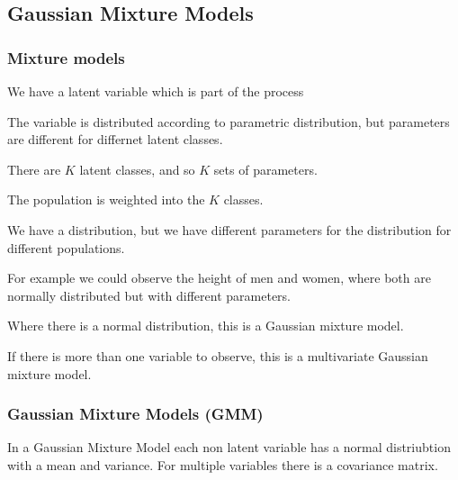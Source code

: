 
\subsection{Gaussian Mixture Models}
\subsubsection{Mixture models}

We have a latent variable which is part of the process

The variable is distributed according to parametric distribution, but parameters are different for differnet latent classes.

There are \(K\) latent classes, and so \(K\) sets of parameters.

The population is weighted into the \(K\) classes.

We have a distribution, but we have different parameters for the distribution for different populations.

For example we could observe the height of men and women, where both are normally distributed but with different parameters.

Where there is a normal distribution, this is a Gaussian mixture model.

If there is more than one variable to observe, this is a multivariate Gaussian mixture model.

\subsubsection{Gaussian Mixture Models (GMM)}

In a Gaussian Mixture Model each non latent variable has a normal distriubtion with a mean and variance. For multiple variables there is a covariance matrix.

